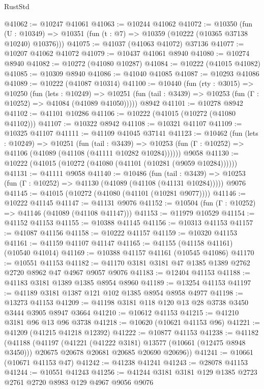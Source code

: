 \begin{lexlean}{RustStd}
\begin{coremodule}
@41062 := @10247 @41061
@41063 := @10244 @41062
@41072 := @10350
    (fun (U : @10349) => @10351 (fun (t : @7) => @10359 (@10222 (@10365 @37138 @10240) @10376)))
@41075 := @41037 (@41063 @41072) @37136
@41077 := @10207 @41062 @41072
@41079 := @10437 @41061 @8940
@41080 := @10274 @8940
@41082 := @10272 (@41080 @10287)
@41084 := @10222 (@41015 @41082)
@41085 := @10309 @8940
@41086 := @41040 @41085
@41087 := @10293 @41086
@41089 := @10222 (@41087 @10314)
@41100 := @10440
    (fun (rty : @3015) =>
    @10250
      (fun (lets : @10249) =>
      @10251 (fun (tail : @3439) => @10253 (fun (Γ : @10252) => @41084 (@41089 @41050)))))
    @8942
@41101 := @10278 @8942
@41102 := @41101 @10286
@41106 := @10222 (@41015 (@10272 (@41080 @41102)))
@41107 := @10322 @8942
@41108 := @10321 @41107
@41109 := @10325 @41107
@41111 := @41109 @41045 @37141
@41123 := @10462
    (fun (lets : @10249) =>
    @10251
      (fun (tail : @3439) =>
      @10253 (fun (Γ : @10252) => @41106 (@41089 (@41108 (@41111 @10282 @10284))))))
    @9058
@41130 := @10222 (@41015 (@10272 (@41080 (@41101 (@10281 (@9059 @10284))))))
@41131 := @41111 @9058
@41140 := @10486
    (fun (tail : @3439) => @10253 (fun (Γ : @10252) => @41130 (@41089 (@41108 (@41131 @10284)))))
    @9076
@41145 := @41015 (@10272 (@41080 (@41101 (@10281 @9077))))
@41146 := @10222 @41145
@41147 := @41131 @9076
@41152 := @10504 (fun (Γ : @10252) => @41146 (@41089 (@41108 @41147)))
@41153 := @11979 @10529
@41154 := @41152 @41153
@41155 := @10388 @41145
@41156 := @10313 @41153
@41157 := @41087 @41156
@41158 := @10222 @41157
@41159 := @10320 @41153
@41161 := @41159 @41107 @41147
@41165 := @41155 (@41158 @41161) (@10540 @41014)
@41169 := @10388 @41157 @41161 (@10545 @41086)
@41170 := @10551 @41153
@41182 := @41170 @3181 @3181 @47 @1385 @1389 @2762 @2720 @8962 @47 @4967 @9057 @9076
@41183 := @12404 @41153
@41188 := @41183 @3181 @1389 @1385 @8954 @8960
@41189 := @13254 @41153
@41197 := @41189 @3181 @1387 @121 @102 @1385 @8954 @8958 @4977
@41198 := @13273 @41153
@41209 := @41198 @3181 @118 @120 @13 @28 @3738 @3450 @3444 @3905 @8947 @3664
@41210 := @10612 @41153
@41215 := @41210 @3181 @96 @13 @96 @3738
@41218 := @10620 (@10621 @41153 @96)
@41221 := @41209 (@41215 @41218 @12392)
@41222 := @10877 @41153
@41238 := @41182
    (@41188
      (@41197
        (@41221 (@41222 @3181) @13577 (@10661 (@12475 @8948 @3450)))
        @20675
        @20678
        @20681
        @20685
        @20690
        @20696))
@41241 := @10661 (@10671 @41153 @47)
@41242 := @41238 @41241
@41243 := @28078 @41153
@41244 := @10551 @41243
@41256 := @41244 @3181 @3181 @129 @1385 @2723 @2761 @2720 @8983 @129 @4967 @9056 @9076

\end{coremodule}
\end{lexlean}
